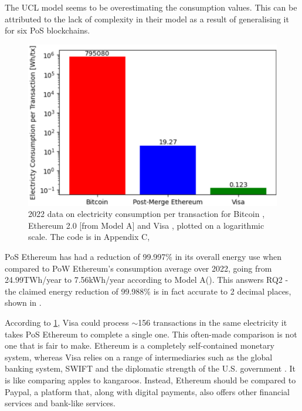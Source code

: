 The UCL model seems to be overestimating the consumption values. This can be attributed to the lack of complexity in their model as a result of generalising it for six PoS blockchains.

\begin{figure}[!htb]
    \includegraphics[width=13cm,center]{Figures/ElectricityConsumptionPlot.png}
    \caption{2022 data on electricity consumption per transaction for Bitcoin \cite{BitcoinDigiconomist}, Ethereum 2.0 [from Model A] and Visa \cite{2022VisaReport}, \cite{VisaHome} plotted on a logarithmic scale. The code is in Appendix C, }
    \label{Figure:ElectricityConsumptionPlot}
\end{figure}

PoS Ethereum has had a reduction of 99.997\% in its overall energy use when compared to PoW Ethereum's consumption average over 2022, going from 24.99TWh/year to 7.56kWh/year according to Model A(\cite{CCRIIndices}). This answers RQ2 - the claimed energy reduction of 99.988\% \cite{EthereumEthereum.orgb} is in fact accurate to 2 decimal places, shown in .

According to \ref{Figure:ElectricityConsumptionPlot}, Visa could process 
$\sim$156 transactions in the same electricity it takes PoS Ethereum to complete a single one. This often-made comparison is not one that is fair to make. Ethereum is a completely self-contained monetary system, whereas Visa relies on a range of intermediaries such as the global banking system, SWIFT and the diplomatic strength of the U.S. government \cite{Carter2021BitcoinComparison}. It is like comparing apples to kangaroos. Instead, Ethereum should be compared to Paypal, a platform that, along with digital payments, also offers other financial services and bank-like services.  

